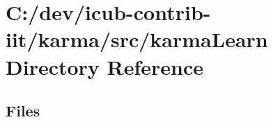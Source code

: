 \section{C\+:/dev/icub-\/contrib-\/iit/karma/src/karma\+Learn Directory Reference}
\label{dir_f234616accb428072e31fe708f34c8ab}
\subsection*{Files}
\begin{DoxyCompactItemize}
\end{DoxyCompactItemize}
